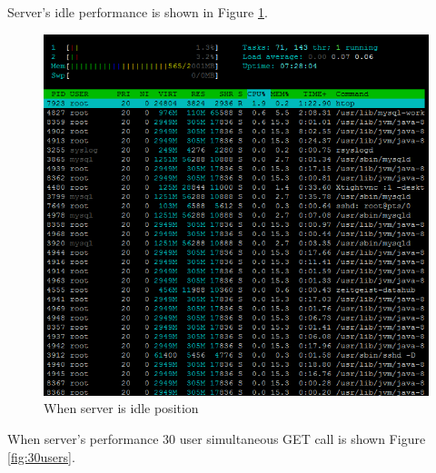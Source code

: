 Server's idle performance is shown in Figure 
\ref{fig:serveridle}.

\begin{figure}[!htbp]
\centering
\includegraphics[width=\textwidth]{projectChapters/images/serveridle.png}
\caption{When server is idle position}
\label{fig:serveridle}
\end{figure}

\newpage

When server's performance 30 user simultaneous GET call is shown Figure
\ref{fig:30users}.


